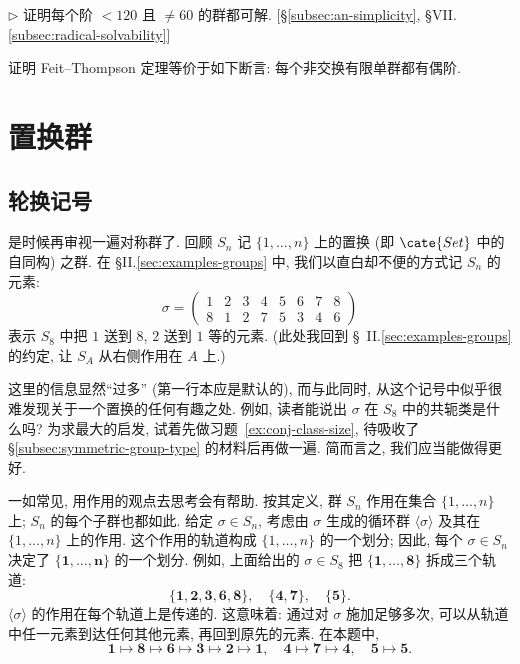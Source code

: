 \begin{prob}
\label{ex:order-less-120-solvable}
$\triangleright$ 证明每个阶 $< 120$ 且 $\neq 60$ 的群都可解. [§\ref{subsec:an-simplicity}, §VII.\ref{subsec:radical-solvability}]
\end{prob}

\begin{prob}
\label{ex:feit-thompson-equiv}
证明 Feit--Thompson 定理等价于如下断言: 每个非交换有限单群都有偶阶.
\end{prob}

\section{置换群}
\label{sec:symmetric-group}

\subsection{轮换记号}
\label{subsec:cycle-notation}

是时候再审视一遍对称群了. 回顾 $S_n$ 记 $\{1,\dots,n\}$ 上的置换 (即 $\cate{Set}$ 中的自同构) 之群. 在 \S II.\ref{sec:examples-groups} 中, 我们以直白却不便的方式记 $S_n$ 的元素:
\[
\sigma = \begin{pmatrix} 1 & 2 & 3 & 4 & 5 & 6 & 7 & 8 \\ 8 & 1 & 2 & 7 & 5 & 3 & 4 & 6 \end{pmatrix}
\]
表示 $S_8$ 中把 $1$ 送到 $8$, $2$ 送到 $1$ 等的元素. (此处我回到 \S~II.\ref{sec:examples-groups} 的约定, 让 $S_A$ 从右侧作用在 $A$ 上.)

这里的信息显然``过多'' (第一行本应是默认的), 而与此同时, 从这个记号中似乎很难发现关于一个置换的任何有趣之处. 例如, 读者能说出 $\sigma$ 在 $S_8$ 中的共轭类是什么吗? 为求最大的启发, 试着先做习题~\ref{ex:conj-class-size}, 待吸收了 \S\ref{subsec:symmetric-group-type} 的材料后再做一遍. 简而言之, 我们应当能做得更好.

一如常见, 用作用的观点去思考会有帮助. 按其定义, 群 $S_n$ 作用在集合 $\{1,\dots,n\}$ 上; $S_n$ 的每个子群也都如此. 给定 $\sigma \in S_n$, 考虑由 $\sigma$ 生成的循环群 $\langle\sigma\rangle$ 及其在 $\{1,\dots,n\}$ 上的作用. 这个作用的轨道构成 $\{1,\dots,n\}$ 的一个划分; 因此, 每个 $\sigma \in S_n$ 决定了 $\{\mathbf{1},\dots,\mathbf{n}\}$ 的一个划分. 例如, 上面给出的 $\sigma \in S_8$ 把 $\{\mathbf{1},\dots,\mathbf{8}\}$ 拆成三个轨道:
\[
\{\mathbf{1},\mathbf{2},\mathbf{3},\mathbf{6},\mathbf{8}\},\quad \{\mathbf{4},\mathbf{7}\},\quad \{\mathbf{5}\}.
\]
$\langle\sigma\rangle$ 的作用在每个轨道上是传递的. 这意味着: 通过对 $\sigma$ 施加足够多次, 可以从轨道中任一元素到达任何其他元素, 再回到原先的元素. 在本题中,
\[
\mathbf{1} \mapsto \mathbf{8} \mapsto \mathbf{6} \mapsto \mathbf{3} \mapsto \mathbf{2} \mapsto \mathbf{1},\quad \mathbf{4} \mapsto \mathbf{7} \mapsto \mathbf{4},\quad \mathbf{5} \mapsto \mathbf{5}.
\]

